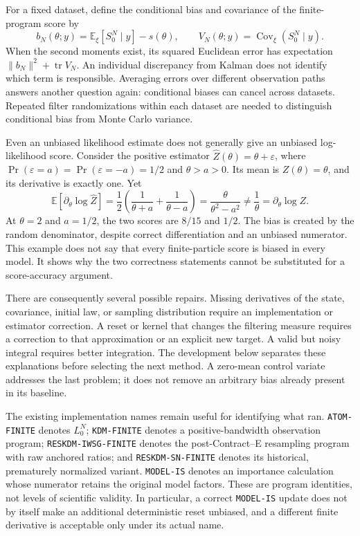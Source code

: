\documentclass[11pt]{article}
\begin{document}
For a fixed dataset, define the conditional bias and covariance of the
finite-program score by
\begin{equation}
 b_N(\theta;y)=\mathbb E_\xi[S_0^N\mid y]-s(\theta),\qquad
 V_N(\theta;y)=\operatorname{Cov}_\xi(S_0^N\mid y).
 \label{eq:conditional-score-error}
\end{equation}
When the second moments exist, its squared Euclidean error has expectation
$\|b_N\|^2+\operatorname{tr}V_N$. An individual discrepancy from Kalman does
not identify which term is responsible. Averaging errors over different
observation paths answers another question again: conditional biases can
cancel across datasets. Repeated filter randomizations within each dataset
are needed to distinguish conditional bias from Monte Carlo variance.

Even an unbiased likelihood estimate does not generally give an unbiased
log-likelihood score. Consider the positive estimator
$\widehat Z(\theta)=\theta+\varepsilon$, where
$\Pr(\varepsilon=a)=\Pr(\varepsilon=-a)=1/2$ and $\theta>a>0$.
Its mean is $Z(\theta)=\theta$, and its derivative is exactly one. Yet
\begin{equation}
 \mathbb E\left[\partial_\theta\log\widehat Z\right]
 =\frac12\left(\frac1{\theta+a}+\frac1{\theta-a}\right)
 =\frac{\theta}{\theta^2-a^2}\ne\frac1\theta
 =\partial_\theta\log Z.
 \label{eq:unbiased-value-biased-score}
\end{equation}
At $\theta=2$ and $a=1/2$, the two scores are $8/15$ and $1/2$.
The bias is created by the random denominator, despite correct
differentiation and an unbiased numerator. This example does not say that
every finite-particle score is biased in every model. It shows why the two
correctness statements cannot be substituted for a score-accuracy argument.

There are consequently several possible repairs. Missing derivatives of the
state, covariance, initial law, or sampling distribution require an
implementation or estimator correction. A reset or kernel that changes the
filtering measure requires a correction to that approximation or an explicit
new target. A valid but noisy integral requires better integration. The
development below separates these explanations before selecting the next
method. A zero-mean control variate addresses the last problem; it does not
remove an arbitrary bias already present in its baseline.

The existing implementation names remain useful for identifying what ran.
\texttt{ATOM-FINITE} denotes $L_0^N$; \texttt{KDM-FINITE} denotes a
positive-bandwidth observation program; \texttt{RESKDM-IWSG-FINITE} denotes
the post-Contract--E resampling program with raw anchored ratios; and
\texttt{RESKDM-SN-FINITE} denotes its historical, prematurely normalized
variant. \texttt{MODEL-IS} denotes an importance calculation whose numerator
retains the original model factors. These are program identities, not levels
of scientific validity. In particular, a correct \texttt{MODEL-IS} update
does not by itself make an additional deterministic reset unbiased, and a
different finite derivative is acceptable only under its actual name.
\end{document}
